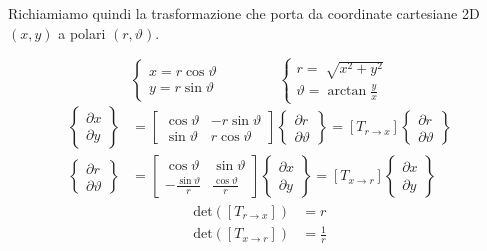 Richiamiamo quindi la trasformazione che porta da coordinate cartesiane 2D $\left(x,y\right)$ a polari $\left(r,\vartheta\right)$.

\begin{equation}
\label{eq:4polare1}
\left\{
\begin{aligned}
x = r \cos \vartheta\\
y = r \sin\vartheta
\end{aligned}
\right. 
\qquad\qquad
\left\{
\begin{aligned}
r = \sqrt[]{x^2+y^2}\\
\vartheta = \arctan \frac{y}{x}
\end{aligned}
\right.
\end{equation}
\begin{align}
\label{eq:4polare2}
\left\{\begin{aligned}\partial x\\ \partial y\end{aligned}\right\}
&= \left[\begin{array}{cc}
\cos \vartheta & -r\sin \vartheta\\
\sin \vartheta & r\cos\vartheta\end{array}\right]
\left\{\begin{aligned}\partial r\\ \partial\vartheta\end{aligned}\right\}
=\left[T_{r\rightarrow x}\right]\left\{\begin{aligned}\partial r\\ \partial\vartheta\end{aligned}\right\}\\
\label{eq:4polare3}
\left\{\begin{aligned}\partial r\\ \partial\vartheta\end{aligned}\right\}
&= \left[\begin{array}{cc}
\cos \vartheta & \sin \vartheta\\
-\frac{\sin \vartheta}{r} & \frac{\cos\vartheta}{r}\end{array}\right]
\left\{\begin{aligned}\partial x\\ \partial y\end{aligned}\right\}
=\left[T_{x\rightarrow r}\right]\left\{\begin{aligned}\partial x\\ \partial y\end{aligned}\right\}
\end{align}
\begin{align}
\label{eq:4polare4_a}
\text{det}\left(\left[T_{r\rightarrow x}\right]\right) &= r\\
\label{eq:4polare4_b}
\text{det}\left(\left[T_{x\rightarrow r}\right]\right) &= \frac{1}{r}
\end{align}

